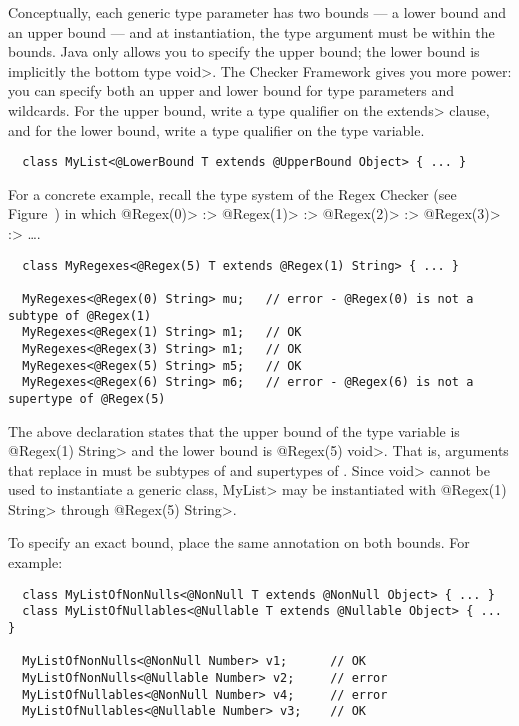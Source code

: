 Conceptually, each generic type parameter has two bounds --- a lower bound
and an upper bound --- and at instantiation, the type argument must be
within the bounds.  Java only allows you to specify the upper bound; the
lower bound is implicitly the bottom type \<void>.  The Checker Framework
gives you more power:  you can specify both an upper and lower bound for
type parameters and wildcards.  For the upper bound, write a type qualifier
on the \<extends> clause, and for the lower bound, write a type qualifier
on the type variable.

\begin{Verbatim}
  class MyList<@LowerBound T extends @UpperBound Object> { ... }
\end{Verbatim}

For a concrete example, recall the type system of the Regex Checker (see
Figure~) in which
 \<@Regex(0)> :>
 \<@Regex(1)> :>
 \<@Regex(2)> :>
 \<@Regex(3)> :> \ldots.

\begin{Verbatim}
  class MyRegexes<@Regex(5) T extends @Regex(1) String> { ... }

  MyRegexes<@Regex(0) String> mu;   // error - @Regex(0) is not a subtype of @Regex(1)
  MyRegexes<@Regex(1) String> m1;   // OK
  MyRegexes<@Regex(3) String> m1;   // OK
  MyRegexes<@Regex(5) String> m5;   // OK
  MyRegexes<@Regex(6) String> m6;   // error - @Regex(6) is not a supertype of @Regex(5)
\end{Verbatim}

The above declaration states that the upper bound of the type variable
is \<@Regex(1) String> and the lower bound is \<@Regex(5) void>.  That is,
arguments that replace  in  must be subtypes of
 and supertypes of .
Since \<void> cannot be used to instantiate a generic class, \<MyList> may
be instantiated with \<@Regex(1) String> through \<@Regex(5) String>.


To specify an exact bound, place the same annotation on both bounds.  For example:

\begin{Verbatim}
  class MyListOfNonNulls<@NonNull T extends @NonNull Object> { ... }
  class MyListOfNullables<@Nullable T extends @Nullable Object> { ... }

  MyListOfNonNulls<@NonNull Number> v1;      // OK
  MyListOfNonNulls<@Nullable Number> v2;     // error
  MyListOfNullables<@NonNull Number> v4;     // error
  MyListOfNullables<@Nullable Number> v3;    // OK
\end{Verbatim}


